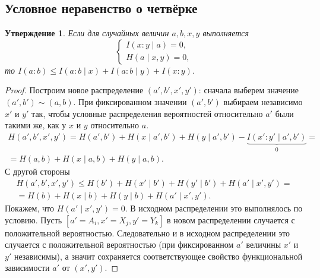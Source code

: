 \documentclass[12pt]{article}
\theoremstyle{definition}
\theoremstyle{plain}
\newtheorem{statement}{Утверждение}[section]
\theoremstyle{remark}
\begin{document}
\subsection{Условное неравенство о четвёрке}
\begin{statement}
    Если для случайных величин $a,b,x,y$ выполняется
    \[
        \begin{cases}
            I(x:y\mid a) = 0,\\
            H(a\mid x,y) = 0,
        \end{cases}
    \]
    то $I(a:b)\le I(a:b\mid x) + I(a:b\mid y) + I(x:y).$
\end{statement}
\begin{proof}
    Построим новое распределение $(a',b',x',y')$:
    сначала выберем значение $(a',b')\sim (a,b)$.
    При фиксированном значении $(a',b')$ выбираем независимо $x'$ и $y'$ так,
    чтобы условные распределения вероятностей относительно $a'$ были такими же, как у $x$ и $y$ относительно $a$.
    \begin{multline*}
    H(a',b',x',y') = H(a',b') + H(x\mid a',b') + H(y\mid a',b') - \underbrace{I(x':y'\mid
    a',b')}_{0} =\\
    = H(a,b) + H(x\mid a,b) + H(y\mid a,b).
    \end{multline*}
    С другой стороны
    \begin{multline*}
    H(a',b',x',y') \le H(b') + H(x'\mid b') + H(y'\mid b') + H(a'\mid x',y') =\\
    = H(b) + H(x\mid b) + H(y\mid b) + H(a'\mid x', y').
    \end{multline*}
    Покажем, что $H(a'\mid x',y') = 0$. В исходном распределении это выполнялось по условию. 
    Пусть $[a' = A_i, x' = X_j, y' = Y_k]$ в новом распределении случается с положительной
    вероятностью. Следовательно и в исходном распределении это случается с положительной 
    вероятностью (при фиксированном $a'$ величины $x'$ и $y'$ независимы), 
    а значит сохраняется соответствующее свойство функциональной зависимости $a'$ от $(x',y')$.


\end{proof}
\end{document}
